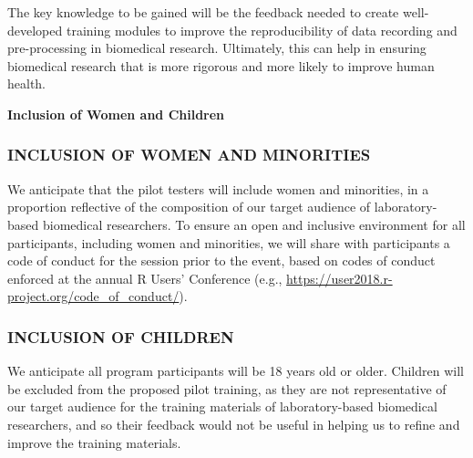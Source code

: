 \documentclass[pdftex,english,11.5pt,parskip=half]{scrartcl}
\begin{document}
The 
key knowledge to be gained will be the feedback needed to create well-developed training modules to improve the 
reproducibility of data recording and pre-processing in biomedical research. 
Ultimately, this can help in ensuring biomedical research that is more 
rigorous and more likely to improve human health.

\pagebreak

{\large \textbf{Inclusion of Women and Children}}

\subsubsection*{INCLUSION OF WOMEN AND MINORITIES}

We anticipate that the pilot testers will include women and minorities, in a 
proportion reflective of the composition of our target audience of laboratory-based
biomedical researchers. To ensure an open and inclusive environment for all 
participants, including women and minorities, we will share with participants a 
code of conduct for the session prior to the event, based on codes of conduct 
enforced at the annual R Users' Conference (e.g., \url{https://user2018.r-project.org/code_of_conduct/}).

\subsubsection*{INCLUSION OF CHILDREN}

We anticipate all program participants will be 18 years old or older. Children will be excluded from the proposed pilot training, as they are not representative of our target audience for the training materials of laboratory-based biomedical researchers, and so their feedback would not be useful in helping us to refine and 
improve the training materials. 
\end{document}
